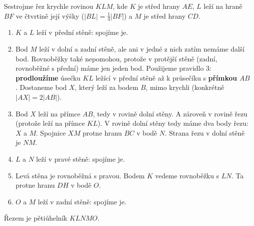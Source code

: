 \begin{example}\label{ex:rez-prodlouzeni}
  Sestrojme řez krychle rovinou $KLM$, kde $K$ je střed hrany $AE$, $L$ leží na hraně $BF$ ve čtvrtině její výšky ($|BL| = \frac{1}{4}|BF|$) a $M$ je střed hrany $CD$.
  \begin{enumerate}
    \item $K$ a $L$ leží v přední stěně: spojíme je.
    \item Bod $M$ leží v dolní a zadní stěně, ale ani v jedné z nich zatím nemáme další bod. Rovnoběžky také nepomohou, protože v protější stěně (zadní, rovnoběžné s přední) máme jen jeden bod. Použijeme pravidlo 3: \textbf{prodloužíme} úsečku $KL$ ležící v přední stěně až k průsečíku s \textbf{přímkou} $AB$. Dostaneme bod $X$, který leží za bodem $B$, mimo krychli (konkrétně $|AX| = 2|AB|$).
    \item Bod $X$ leží na přímce $AB$, tedy v rovině dolní stěny. A zároveň v rovině řezu (protože leží na přímce $KL$). V rovině dolní stěny tedy máme dva body řezu: $X$ a $M$. Spojnice $XM$ protne hranu $BC$ v bodě $N$. Strana řezu v dolní stěně je $NM$.
    \item $L$ a $N$ leží v pravé stěně: spojíme je.
    \item Levá stěna je rovnoběžná s pravou. Bodem $K$ vedeme rovnoběžku s $LN$. Ta protne hranu $DH$ v bodě $O$.
    \item $O$ a $M$ leží v zadní stěně: spojíme je.
  \end{enumerate}
  Řezem je pětiúhelník $KLNMO$.
  \begin{center}
    \hspace{1cm}
    \begin{tikzpicture}[scale=2, krychle]

\end{tikzpicture}
\end{center}
\end{example}
